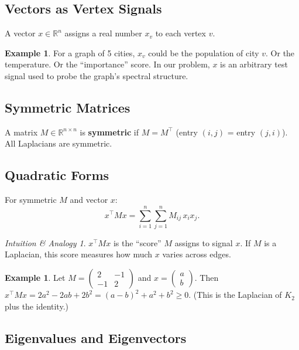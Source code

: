 \documentclass[12pt]{article}
\theoremstyle{definition}
\newtheorem{example}[theorem]{Example}
\theoremstyle{remark}
\newtheorem{intuition}[theorem]{Intuition \& Analogy}
\begin{document}
\subsection{Vectors as Vertex Signals}

A vector $x \in \mathbb{R}^n$ assigns a real number $x_v$ to each vertex $v$.

\begin{example}
For a graph of 5 cities, $x_v$ could be the population of city $v$.
Or the temperature.  Or the ``importance'' score.
In our problem, $x$ is an arbitrary test signal used to probe the graph's spectral structure.
\end{example}

\subsection{Symmetric Matrices}

A matrix $M \in \mathbb{R}^{n \times n}$ is \textbf{symmetric} if $M = M^\top$ (entry $(i,j)$ = entry $(j,i)$).
All Laplacians are symmetric.

\subsection{Quadratic Forms}

For symmetric $M$ and vector $x$:
\[
  x^\top M x = \sum_{i=1}^n \sum_{j=1}^n M_{ij}\, x_i x_j.
\]

\begin{intuition}
$x^\top M x$ is the ``score'' $M$ assigns to signal $x$.
If $M$ is a Laplacian, this score measures how much $x$ varies across edges.
\end{intuition}

\begin{example}
Let $M = \begin{pmatrix}2&-1\\-1&2\end{pmatrix}$ and $x = \begin{pmatrix}a\\b\end{pmatrix}$.
Then $x^\top M x = 2a^2 - 2ab + 2b^2 = (a-b)^2 + a^2 + b^2 \ge 0$.
(This is the Laplacian of $K_2$ plus the identity.)
\end{example}

\subsection{Eigenvalues and Eigenvectors}
\end{document}
